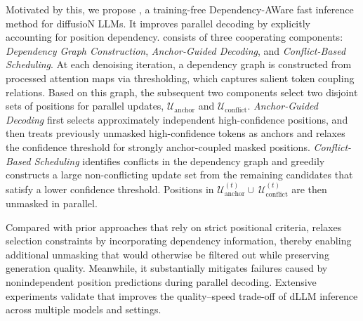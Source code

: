 Motivated by this, we propose \dawn{}, a training-free Dependency-AWare fast inference method for diffusioN LLMs. It improves parallel decoding by explicitly accounting for position dependency. 
\dawn{} consists of three cooperating components: \textit{Dependency Graph Construction}, \textit{Anchor-Guided Decoding}, and \textit{Conflict-Based Scheduling}. At each denoising iteration, a dependency graph is constructed from processed attention maps via thresholding, which captures salient token coupling relations. Based on this graph, the subsequent two components select two disjoint sets of positions for parallel updates, $\mathcal{U}_{\text{anchor}}$ and $\mathcal{U}_{\text{conflict}}$. \textit{Anchor-Guided Decoding} first selects approximately independent high-confidence positions, and then treats previously unmasked high-confidence tokens as anchors and relaxes the confidence threshold for strongly anchor-coupled masked positions. \textit{Conflict-Based Scheduling} identifies conflicts in the dependency graph and greedily constructs a large non-conflicting update set from the remaining candidates that satisfy a lower confidence threshold. Positions in $\mathcal{U}^{(t)}_{\text{anchor}} \cup~ \mathcal{U}^{(t)}_{\text{conflict}}$ are then unmasked in parallel. 

Compared with prior approaches that rely on strict positional criteria, \dawn{} relaxes selection constraints by incorporating dependency information, thereby enabling additional unmasking that would otherwise be filtered out while preserving generation quality. Meanwhile, it substantially mitigates failures caused by nonindependent position predictions during parallel decoding.  Extensive experiments validate that \dawn{} improves the quality--speed trade-off of dLLM inference across multiple models and settings.

